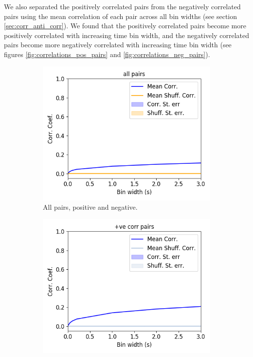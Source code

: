     We also separated the positively correlated pairs from the negatively correlated pairs using the mean correlation of each pair across all bin widths (see section \ref{sec:corr_anti_corr}). We found that the positively correlated pairs become more positively correlated with increasing time bin width, and the negatively correlated pairs become more negatively correlated with increasing time bin width (see figures \ref{fig:correlations_pos_pairs} and \ref{fig:correlations_neg_pairs}).

    \begin{figure}[p]
        \begin{subfigure}[h]{0.5\linewidth}
            \includegraphics[width=\linewidth]{figures/eight_probe/Krebs_corr_all_pairs.png}
            \caption{All pairs, positive and negative.}
            \label{fig:correlations_all_pairs}
        \end{subfigure}
        \begin{subfigure}[h]{0.5\linewidth}
            \includegraphics[width=\linewidth]{figures/eight_probe/Krebs_corr_pos_pairs.png}

\end{subfigure}
\end{figure}
